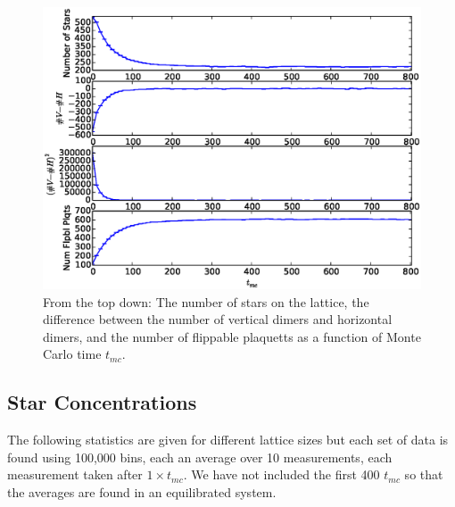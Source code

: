 \documentclass[aps,floatfix,11pt]{revtex4-1}
\begin{document}
\begin{figure}[h]
    \centering
    \includegraphics[width=8.5 cm]{num_order_params}
    \caption{From the top down: The number of stars on the lattice, the difference between the
    number of vertical dimers and horizontal dimers, and the number of flippable plaquetts as a
    function of Monte Carlo time $t_{mc}$. \label{fig:nums_of_things}}
\end{figure}

%

\subsection{Star Concentrations}

The following statistics are given for different lattice sizes but each set of data is found using
100,000 bins, each an average over 10 measurements, each measurement taken after $1\times t_{mc}$.
We have not included the first 400 $t_{mc}$ so that the averages are found in an equilibrated
system.
\end{document}

